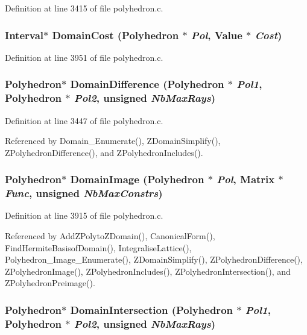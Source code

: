 Definition at line 3415 of file polyhedron.c.
\subsubsection{\setlength{\rightskip}{0pt plus 5cm}Interval$\ast$ Domain\-Cost (Polyhedron $\ast$ {\em Pol}, Value $\ast$ {\em Cost})}\label{polyhedron_8c_a54}




Definition at line 3951 of file polyhedron.c.
\subsubsection{\setlength{\rightskip}{0pt plus 5cm}Polyhedron$\ast$ Domain\-Difference (Polyhedron $\ast$ {\em Pol1}, Polyhedron $\ast$ {\em Pol2}, unsigned {\em Nb\-Max\-Rays})}\label{polyhedron_8c_a46}




Definition at line 3447 of file polyhedron.c.

Referenced by Domain\_\-Enumerate(), ZDomain\-Simplify(), ZPolyhedron\-Difference(), and ZPolyhedron\-Includes().

\subsubsection{\setlength{\rightskip}{0pt plus 5cm}Polyhedron$\ast$ Domain\-Image (Polyhedron $\ast$ {\em Pol}, Matrix $\ast$ {\em Func}, unsigned {\em Nb\-Max\-Constrs})}\label{polyhedron_8c_a53}




Definition at line 3915 of file polyhedron.c.

Referenced by Add\-ZPolyto\-ZDomain(), Canonical\-Form(), Find\-Hermite\-Basisof\-Domain(), Integralise\-Lattice(), Polyhedron\_\-Image\_\-Enumerate(), ZDomain\-Simplify(), ZPolyhedron\-Difference(), ZPolyhedron\-Image(), ZPolyhedron\-Includes(), ZPolyhedron\-Intersection(), and ZPolyhedron\-Preimage().

\subsubsection{\setlength{\rightskip}{0pt plus 5cm}Polyhedron$\ast$ Domain\-Intersection (Polyhedron $\ast$ {\em Pol1}, Polyhedron $\ast$ {\em Pol2}, unsigned {\em Nb\-Max\-Rays})}\label{polyhedron_8c_a32}





